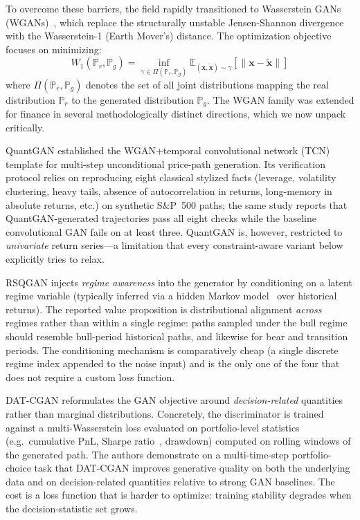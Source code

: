 To overcome these barriers, the field rapidly transitioned to Wasserstein GANs (WGANs)~\citep{arjovsky2017wgan,naritomi2020data}, which replace the structurally unstable Jensen-Shannon divergence with the Wasserstein-1 (Earth Mover's) distance. The optimization objective focuses on minimizing:
\begin{equation}
W_1(\mathbb{P}_r, \mathbb{P}_g) = \inf_{\gamma \in \Pi(\mathbb{P}_r, \mathbb{P}_g)} \mathbb{E}_{(\mathbf{x}, \tilde{\mathbf{x}}) \sim \gamma}[\|\mathbf{x} - \tilde{\mathbf{x}}\|]
\end{equation}
where $\Pi(\mathbb{P}_r, \mathbb{P}_g)$ denotes the set of all joint distributions mapping the real distribution $\mathbb{P}_r$ to the generated distribution $\mathbb{P}_g$. The WGAN family was extended for finance in several methodologically distinct directions, which we now unpack critically.

QuantGAN \citep{wiese2020} established the WGAN+temporal convolutional network (TCN)~\citep{bai2018empirical} template for multi-step unconditional price-path generation. Its verification protocol relies on reproducing eight classical stylized facts (leverage, volatility clustering, heavy tails, absence of autocorrelation in returns, long-memory in absolute returns, etc.) on synthetic S\&P~500 paths; the same study reports that QuantGAN-generated trajectories pass all eight checks while the baseline convolutional GAN fails on at least three. QuantGAN is, however, restricted to \emph{univariate} return series---a limitation that every constraint-aware variant below explicitly tries to relax.

RSQGAN \citep{RSQGAN} injects \emph{regime awareness} into the generator by conditioning on a latent regime variable (typically inferred via a hidden Markov model~\citep{rabiner1989tutorial,hamilton1989new} over historical returns). The reported value proposition is distributional alignment \emph{across} regimes rather than within a single regime: paths sampled under the bull regime should resemble bull-period historical paths, and likewise for bear and transition periods. The conditioning mechanism is comparatively cheap (a single discrete regime index appended to the noise input) and is the only one of the four that does not require a custom loss function.

DAT-CGAN \citep{DAT-CGAN} reformulates the GAN objective around \emph{decision-related} quantities rather than marginal distributions. Concretely, the discriminator is trained against a multi-Wasserstein loss evaluated on portfolio-level statistics (e.g.\ cumulative PnL, Sharpe ratio~\citep{sharpe1994sharpe}, drawdown) computed on rolling windows of the generated path. The authors demonstrate on a multi-time-step portfolio-choice task that DAT-CGAN improves generative quality on both the underlying data and on decision-related quantities relative to strong GAN baselines. The cost is a loss function that is harder to optimize: training stability degrades when the decision-statistic set grows.

